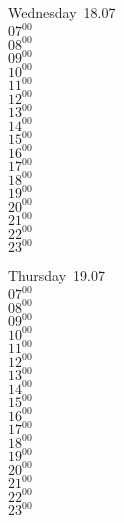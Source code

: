 \documentclass[11pt, a4paper]{book}\usepackage[]{graphicx}\usepackage[]{color}
\begin{document}
\begin{weekdaybox}
  Wednesday~18.07\\
  { 
  \vfill
  $07^{00}$\\
$08^{00}$\\
$09^{00}$\\
$10^{00}$\\
$11^{00}$\\
$12^{00}$\\
$13^{00}$\\
$14^{00}$\\
$15^{00}$\\
$16^{00}$\\
$17^{00}$\\
$18^{00}$\\
$19^{00}$\\
$20^{00}$\\
$21^{00}$\\
$22^{00}$\\
$23^{00}$\\
  }
\end{weekdaybox}
\clearpage
\begin{headerbox}
\end{headerbox}
\begin{weekdaybox}
  Thursday~19.07\\
  { 
  \vfill
  $07^{00}$\\
$08^{00}$\\
$09^{00}$\\
$10^{00}$\\
$11^{00}$\\
$12^{00}$\\
$13^{00}$\\
$14^{00}$\\
$15^{00}$\\
$16^{00}$\\
$17^{00}$\\
$18^{00}$\\
$19^{00}$\\
$20^{00}$\\
$21^{00}$\\
$22^{00}$\\
$23^{00}$\\
  }
\end{weekdaybox} 
\end{document}
